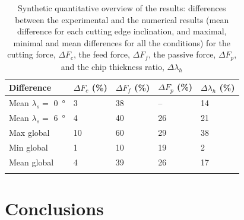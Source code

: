 \documentclass[preprint,12pt,times]{elsarticle}
\begin{document}
%
\begin{table}[!h]
\begin{center}
\caption{\label{tab:Synth} Synthetic quantitative overview of the results: differences between the experimental and the numerical results (mean difference for each cutting edge inclination, and maximal, minimal and mean differences for all the conditions) for the cutting force, $\Delta F_c$, the feed force, $\Delta F_f$, the passive force, $\Delta F_p$, and the chip thickness ratio, $\Delta \lambda_h$}
\begin{tabular}{lllll}
\hline\noalign{\smallskip}
Difference & $\Delta F_c$ (\unit{\%}) & $\Delta F_f$ (\unit{\%}) & $\Delta F_p$ (\unit{\%}) & $\Delta \lambda_h$ (\unit{\%})\\
\hline\noalign{\smallskip}
Mean $\lambda_s =$ \qty{0}{\degree} & 3 & 38 & -- & 14\\
Mean $\lambda_s =$ \qty{6}{\degree} & 4 & 40 & 26 & 21\\
Max global & 10 & 60 & 29 & 38\\
Min global & 1 & 10 & 19 & 2\\
Mean global & 4 & 39 & 26 & 17\\
\noalign{\smallskip}\hline\noalign{\smallskip}
\end{tabular}
\end{center}
\end{table}
%

\section{Conclusions}
\end{document}
